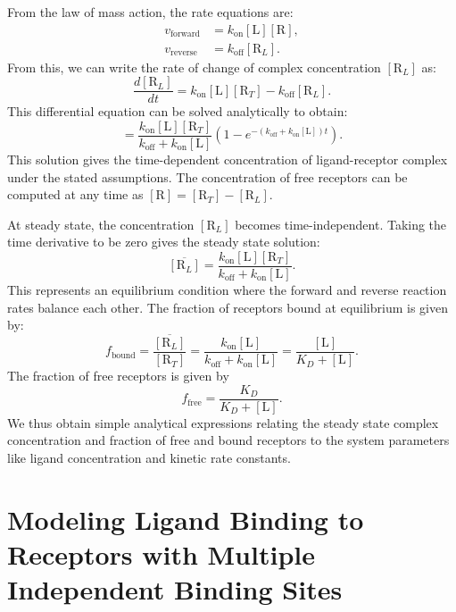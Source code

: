 From the law of mass action, the rate equations are:
\begin{align*}
	v_\text{forward} &= k_\text{on} [\text{L}][\text{R}], \\
	v_\text{reverse} &= k_\text{off} [\text{R}_L].
\end{align*}
From this, we can write the rate of change of complex concentration $[\text{R}_L]$ as:
\begin{equation*}
	\frac{d[\text{R}_L]}{dt} = k_\text{on}[\text{L}][\text{R}_T] - k_\text{off} [\text{R}_L].
\end{equation*}
This differential equation can be solved analytically to obtain:
\begin{equation}
	[\text{R}_L] = \frac{k_\text{on}[\text{L}][\text{R}_T]}{k_\text{off}+k_\text{on}[\text{L}]}\left(1 - e^{-(k_\text{off}+k_\text{on}[\text{L}])t}\right).
\label{eq:24.05}
\end{equation}
This solution gives the time-dependent concentration of ligand-receptor complex under the stated assumptions. The concentration of free receptors can be computed at any time as $[\text{R}]=[\text{R}_T]-[\text{R}_L]$.

At steady state, the concentration $[\text{R}_L]$ becomes time-independent. Taking the time derivative to be zero gives the steady state solution:
\begin{equation}
	\overline{[\text{R}_L]} = \frac{k_\text{on}[\text{L}][\text{R}_T]}{k_\text{off}+k_\text{on}[\text{L}]}.
\label{eq:24.06}
\end{equation}
This represents an equilibrium condition where the forward and reverse reaction rates balance each other. The fraction of receptors bound at equilibrium is given by:
\begin{equation*}
	f_\text{bound} = \frac{\overline{[\text{R}_L]}}{[\text{R}_T]} = \frac{k_\text{on}[\text{L}]}{k_\text{off}+k_\text{on}[\text{L}]} = \frac{[\text{L}]}{K_D+[\text{L}]}.
\end{equation*}
The fraction of free receptors is given by
\begin{equation*}
    f_\text{free} = \frac{K_D}{K_D+[\text{L}]}.
\end{equation*}
We thus obtain simple analytical expressions relating the steady state complex concentration and fraction of free and bound receptors to the system parameters like ligand concentration and kinetic rate constants.

\section{Modeling Ligand Binding to Receptors with Multiple Independent Binding Sites}

